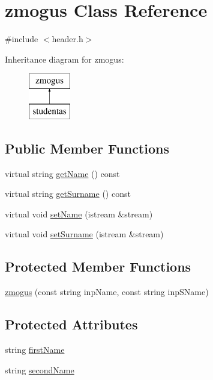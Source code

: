 \hypertarget{classzmogus}{}\section{zmogus Class Reference}
\label{classzmogus}


{\ttfamily \#include $<$header.\+h$>$}

Inheritance diagram for zmogus\+:\begin{figure}[H]
\begin{center}
\leavevmode
\includegraphics[height=2.000000cm]{classzmogus}
\end{center}
\end{figure}
\subsection*{Public Member Functions}
\begin{DoxyCompactItemize}
\item 
virtual string \mbox{\hyperlink{classzmogus_ae9aa17e5d064dcf342e4115d7b58fc22}{get\+Name}} () const
\item 
virtual string \mbox{\hyperlink{classzmogus_ae6be958db4c6c28ab58f29fbe28d0048}{get\+Surname}} () const
\item 
virtual void \mbox{\hyperlink{classzmogus_a0f34f460bf51687eef14fab57b329557}{set\+Name}} (istream \&stream)
\item 
virtual void \mbox{\hyperlink{classzmogus_a4300d505c5fe94928cedeb8109e0f620}{set\+Surname}} (istream \&stream)
\end{DoxyCompactItemize}
\subsection*{Protected Member Functions}
\begin{DoxyCompactItemize}
\item 
\mbox{\hyperlink{classzmogus_a4ead87c9e0f93b14bfdde10423d967b1}{zmogus}} (const string inp\+Name, const string inp\+S\+Name)
\end{DoxyCompactItemize}
\subsection*{Protected Attributes}
\begin{DoxyCompactItemize}
\item 
string \mbox{\hyperlink{classzmogus_a85c98f02b2870907f894a98c2025dce7}{first\+Name}}
\item 
string \mbox{\hyperlink{classzmogus_ab2ea3c1645ecfdf49d8df90cf8f793eb}{second\+Name}}
\end{DoxyCompactItemize}


